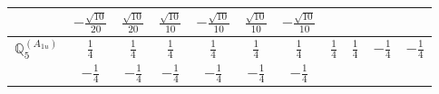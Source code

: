 \documentclass[fleqn,10pt,landscape]{article}
\begin{document}
\begin{itemize}
{\begin{center}
\begin{longtable}{ccccccccccc}
& $ - \frac{\sqrt{10}}{20} $ & $ \frac{\sqrt{10}}{20} $ & $ \frac{\sqrt{10}}{10} $ & $ - \frac{\sqrt{10}}{10} $ & $ \frac{\sqrt{10}}{10} $ & $ - \frac{\sqrt{10}}{10} $ & $  $ & $  $ & $  $ & $  $ \\ \hline
$\mathbb{Q}_{5}^{(A_{1u})}$ & $ \frac{1}{4} $ & $ \frac{1}{4} $ & $ \frac{1}{4} $ & $ \frac{1}{4} $ & $ \frac{1}{4} $ & $ \frac{1}{4} $ & $ \frac{1}{4} $ & $ \frac{1}{4} $ & $ - \frac{1}{4} $ & $ - \frac{1}{4} $ \\
& $ - \frac{1}{4} $ & $ - \frac{1}{4} $ & $ - \frac{1}{4} $ & $ - \frac{1}{4} $ & $ - \frac{1}{4} $ & $ - \frac{1}{4} $ & $  $ & $  $ & $  $ & $  $ \\
\end{longtable}
\end{center}
}
\end{itemize}
\end{document}
